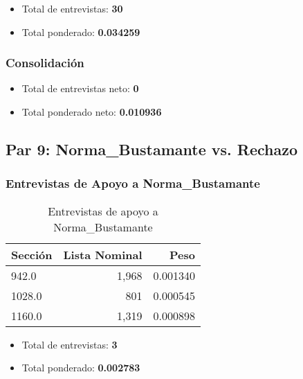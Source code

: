 \documentclass[a4paper,12pt]{article}
\begin{document}
\begin{itemize}
\item Total de entrevistas: \textbf{30}
\item Total ponderado: \textbf{0.034259}
\end{itemize}

\subsubsection*{Consolidación}
\begin{itemize}
\item Total de entrevistas neto: \textbf{0}
\item Total ponderado neto: \textbf{0.010936}
\end{itemize}

\subsection*{Par 9: Norma_Bustamante vs. Rechazo}

\subsubsection*{Entrevistas de Apoyo a Norma_Bustamante}
\begin{table}[h]
\centering
\begin{tabular}{lrr}
\toprule
Sección & Lista Nominal & Peso \\ \midrule
942.0 & 1,968 & 0.001340 \\ 
1028.0 & 801 & 0.000545 \\ 
1160.0 & 1,319 & 0.000898 \\ 
\bottomrule
\end{tabular}
\caption{Entrevistas de apoyo a Norma_Bustamante}
\end{table}

\begin{itemize}
\item Total de entrevistas: \textbf{3}
\item Total ponderado: \textbf{0.002783}
\end{itemize}
\end{document}
